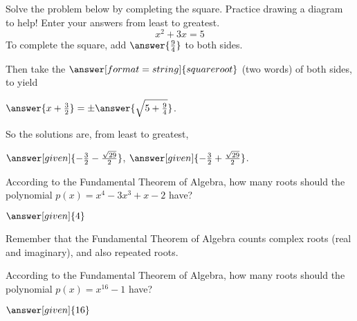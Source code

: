 \documentclass[nooutcomes]{ximera}
\begin{document}
\begin{problem}
Solve the problem below by completing the square.  Practice drawing a diagram to help! Enter your answers from least to greatest.
\[
x^2 + 3x = 5
\]
To complete the square, add $\answer{\frac{9}{4}}$ to both sides.  
\begin{problem}
Then take the $\answer[format=string]{square root}$ (two words) of both sides, to yield
\begin{prompt}
$\answer{x+\frac{3}{2}} = \pm \answer{\sqrt{5+\frac{9}{4}}}$.
\end{prompt}

So the solutions are, from least to greatest,  
\begin{prompt}
	$\answer[given]{-\frac{3}{2}-\frac{\sqrt{29}}{2}}$, $\answer[given]{-\frac{3}{2}+\frac{\sqrt{29}}{2}}$. 
\end{prompt}
\end{problem}
\end{problem}





\begin{problem}
According to the Fundamental Theorem of Algebra, how many roots should the polynomial $p(x) = x^4 - 3x^3 + x - 2$ have?
\begin{prompt}
	$\answer[given]{4}$
\end{prompt}
\begin{hint}
	Remember that the Fundamental Theorem of Algebra counts complex roots (real and imaginary), and also repeated roots.
\end{hint}
\end{problem}



\begin{problem}
According to the Fundamental Theorem of Algebra, how many roots should the polynomial $p(x) = x^{16} - 1$ have?
\begin{prompt}
	$\answer[given]{16}$
\end{prompt}
\end{problem}
\end{document}

